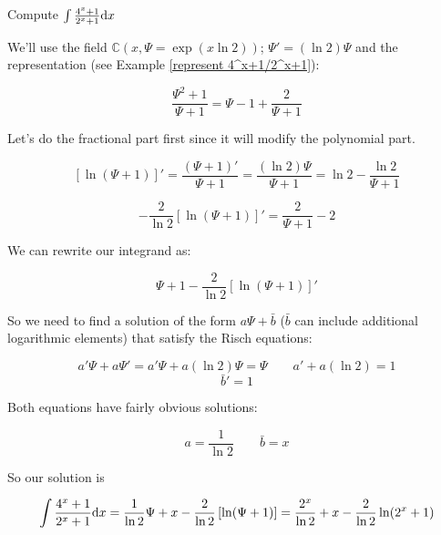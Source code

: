 \endexample


\vfil\eject

\example Compute $\int {{4^x+1}\over{2^x+1}} {\rm d}x$
\label{integrate 4^x+1/2^x+1}

We'll use the field ${\mathbb C}(x,\Psi = \exp(x \ln 2))$; $\Psi' =
(\ln 2)\Psi$ and the representation (see Example
\ref{represent 4^x+1/2^x+1}):

$$ \frac{\Psi^2+1}{\Psi+1} = \Psi-1+\frac{2}{\Psi+1}$$

Let's do the fractional part first since it will modify the polynomial
part.

$$\left[\ln(\Psi+1)\right]' = \frac{(\Psi + 1)'}{\Psi+1} = \frac{(\ln
2)\Psi}{\Psi + 1} = \ln 2 - \frac{\ln 2}{\Psi+1}$$

$$-\frac{2}{\ln 2}\left[\ln(\Psi+1)\right]' = \frac{2}{\Psi+1} - 2$$

We can rewrite our integrand as:

$$ \Psi + 1 - \frac{2}{\ln 2}\left[\ln(\Psi+1)\right]'$$

So we need to find a solution of the form $a\Psi + \bar{b}$ ($\bar{b}$
can include additional logarithmic elements) that satisfy the Risch
equations:

$$a'\Psi + a\Psi' = a'\Psi + a(\ln 2)\Psi = \Psi \qquad a' + a(\ln 2) = 1$$
$$\bar{b}' = 1$$

Both equations have fairly obvious solutions:

$$a = \frac{1}{\ln 2} \qquad \bar{b}=x$$

So our solution is

$$\int {{4^x+1}\over{2^x+1}} {\rm d}x = \frac{1}{\ln 2}\Psi + x  - \frac{2}{\ln 2}\left[\ln(\Psi+1)\right] =
\frac{2^x}{\ln 2} + x - \frac{2}{\ln 2}\ln(2^x+1) $$

\endexample
